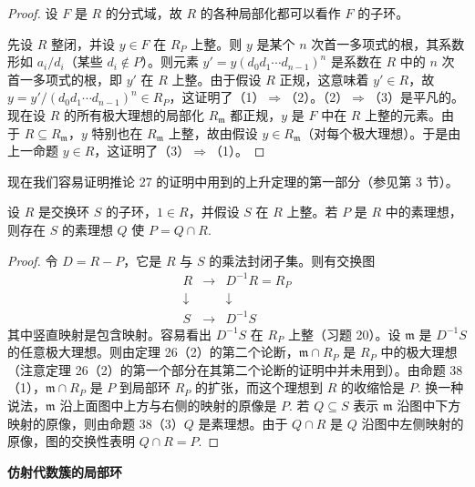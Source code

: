\begin{proof}
设 \(F\) 是 \(R\) 的分式域，故 \(R\) 的各种局部化都可以看作 \(F\) 的子环。

先设 \(R\) 整闭，并设 \(y \in F\) 在 \(R_P\) 上整。则 \(y\) 是某个 \(n\) 次首一多项式的根，其系数形如 \(a_i/d_i\)（某些 \(d_i \notin P\)）。则元素 \(y' = y(d_0d_1\cdots d_{n-1})^n\) 是系数在 \(R\) 中的 \(n\) 次首一多项式的根，即 \(y'\) 在 \(R\) 上整。由于假设 \(R\) 正规，这意味着 \(y' \in R\)，故 \(y = y'/(d_0d_1\cdots d_{n-1})^n \in R_P\)，这证明了（1）\(\Rightarrow\)（2）。（2）\(\Rightarrow\)（3）是平凡的。现在设 \(R\) 的所有极大理想的局部化 \(R_{\mathfrak{m}}\) 都正规，\(y\) 是 \(F\) 中在 \(R\) 上整的元素。由于 \(R \subseteq R_{\mathfrak{m}}\)，\(y\) 特别也在 \(R_{\mathfrak{m}}\) 上整，故由假设 \(y \in R_{\mathfrak{m}}\)（对每个极大理想）。于是由上一命题 \(y \in R\)，这证明了（3）\(\Rightarrow\)（1）。
\end{proof}

现在我们容易证明推论 27 的证明中用到的上升定理的第一部分（参见第 3 节）。

\begin{corollary}\label{cor:15.50}
设 \(R\) 是交换环 \(S\) 的子环，\(1 \in R\)，并假设 \(S\) 在 \(R\) 上整。若 \(P\) 是 \(R\) 中的素理想，则存在 \(S\) 的素理想 \(Q\) 使 \(P = Q \cap R\).
\end{corollary}

\begin{proof}
令 \(D = R-P\)，它是 \(R\) 与 \(S\) 的乘法封闭子集。则有交换图
\[
\begin{array}{ccc}
R & \longrightarrow & D^{-1}R = R_P\\
\downarrow & & \downarrow\\
S & \longrightarrow & D^{-1}S
\end{array}
\]
其中竖直映射是包含映射。容易看出 \(D^{-1}S\) 在 \(R_P\) 上整（习题 20）。设 \(\mathfrak{m}\) 是 \(D^{-1}S\) 的任意极大理想。则由定理 26（2）的第二个论断，\(\mathfrak{m} \cap R_P\) 是 \(R_P\) 中的极大理想（注意定理 26（2）的第一个部分在其第二个论断的证明中并未用到）。由命题 38（1），\(\mathfrak{m} \cap R_P\) 是 \(P\) 到局部环 \(R_P\) 的扩张，而这个理想到 \(R\) 的收缩恰是 \(P\). 换一种说法，\(\mathfrak{m}\) 沿上面图中上方与右侧的映射的原像是 \(P\). 若 \(Q \subseteq S\) 表示 \(\mathfrak{m}\) 沿图中下方映射的原像，则由命题 38（3）\(Q\) 是素理想。由于 \(Q \cap R\) 是 \(Q\) 沿图中左侧映射的原像，图的交换性表明 \(Q \cap R = P\).
\end{proof}

\noindent\textbf{仿射代数簇的局部环}

